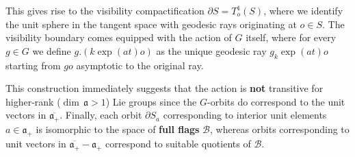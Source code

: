 \documentclass[11pt]{amsart}
\theoremstyle{definition}
\begin{document}
		This gives rise to the visibility compactification $\partial S = T^1_o(S)$, where we identify the unit sphere in the tangent space with geodesic rays originating at $o \in S$. The visibility boundary comes equipped with the action of $G$ itself, where for every $g \in G$ we define $g.(k \exp(a t) o)$ as the unique geodesic ray $g_k \exp(a t) o$ starting from $g o$ asymptotic to the original ray.
		
		This construction immediately suggests that the action is \textbf{not} transitive for higher-rank ($\dim \, \mathfrak{a} > 1$) Lie groups since the $G$-orbits do correspond to the unit vectors in $\overline{\mathfrak{a}_+}$. Finally, each orbit $\partial S_a$ corresponding to interior unit elements $a \in \mathfrak{a}_+$ is isomorphic to the space of \textbf{full flags} $\mathcal{B}$, whereas orbits corresponding to unit vectors in $\overline{\mathfrak{a}_+} - \mathfrak{a}_+$ correspond to suitable quotients of $\mathcal{B}$.  
			
\end{document}
